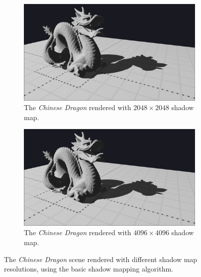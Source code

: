 \begin{figure}
    \begin{subfigure}{0.48\textwidth}
		\centering
        \includegraphics[width=\textwidth]{./graf/tests/basic/cropped/dragon_basic_fhd_2048.png}
        \caption{The \textit{Chinese Dragon} rendered with \(2048\times 2048\) shadow map.}
    \end{subfigure}
	\hfill
    \begin{subfigure}{0.48\textwidth}
		\centering
        \includegraphics[width=\textwidth]{./graf/tests/basic/cropped/dragon_basic_fhd_4096.png}
        \caption{The \textit{Chinese Dragon} rendered with \(4096\times 4096\) shadow map.}
    \end{subfigure}

    \caption{The \textit{Chinese Dragon} scene rendered with different shadow map resolutions, using the basic shadow mapping algorithm.}
    \label{fig:test_basic_dragon_screens}
\end{figure}
